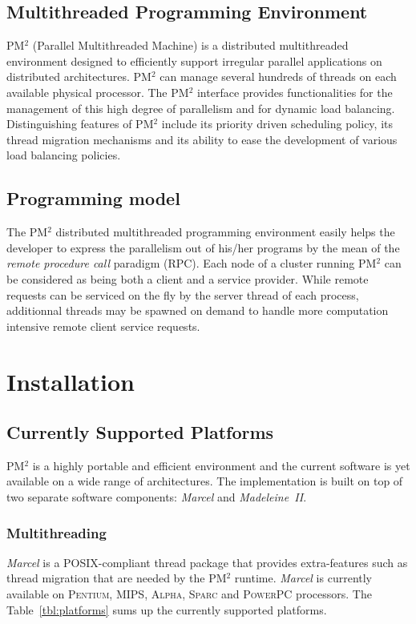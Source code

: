 \documentclass[a4paper,11pt]{report}
\def\pm2{PM$^2$\xspace}
\def\madii{\emph{Madeleine~II}\xspace}
\def\mar{\emph{Marcel}\xspace}
\def\mp{\scriptsize\raggedright}
\begin{document}
\subsection{Multithreaded Programming Environment}
\marginpar{\mp API (C language) + set of libraries}
\pm2 (Parallel Multithreaded Machine) is a distributed multithreaded
environment designed to efficiently support irregular parallel
applications on distributed architectures. \pm2 can manage several
hundreds of threads on each available physical processor. The \pm2
interface provides functionalities for the management of this high
degree of parallelism and for dynamic load balancing. Distinguishing
features of \pm2 include its priority driven scheduling policy, its
thread migration mechanisms and its ability to ease the development
of various load balancing policies.

\subsection{Programming model}
The \pm2 distributed multithreaded programming environment easily
helps the developer to express the parallelism out of his/her programs
by the mean of the \emph{remote procedure call} paradigm (RPC). Each
node of a cluster running \pm2 can be considered as being both a
client and a service provider. While remote requests can be serviced
on the fly by the server thread of each process, additionnal threads
may be spawned on demand to handle more computation intensive remote
client service requests.

\section{Installation}

\subsection{Currently Supported Platforms}
\pm2 is a highly portable and efficient environment and the current
software is yet available on a wide range of architectures. The
implementation is built on top of two separate software components:
\mar and \madii. 
\subsubsection{Multithreading}
\mar is a POSIX-compliant thread package that
provides extra-features such as thread migration that are needed by
the \pm2 runtime. \mar is currently available on \textsc{Pentium},
\textsc{MIPS}, \textsc{Alpha}, \textsc{Sparc} and \textsc{PowerPC}
processors. The Table~\ref{tbl:platforms} sums up the currently
supported platforms. 
\end{document}
